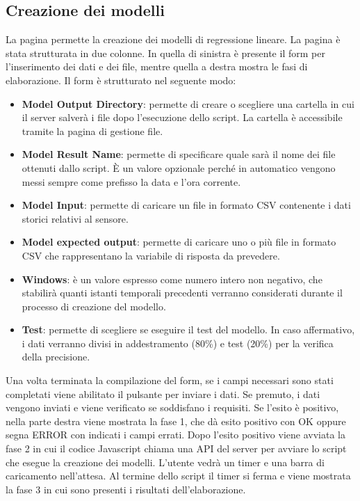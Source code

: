 \subsection{Creazione dei modelli}
\label{secsub:flask-funzionalità-regressione}
La pagina permette la creazione dei modelli di regressione lineare.
La pagina è stata strutturata in due colonne.
In quella di sinistra è presente il form per l'inserimento dei dati e dei file, 
mentre quella a destra mostra le fasi di elaborazione.
Il form è strutturato nel seguente modo:
\begin{itemize}
	\item \textbf{Model Output Directory}: permette di creare o scegliere una cartella in cui il server salverà
	i file dopo l'esecuzione dello script. La cartella è accessibile tramite la pagina di gestione file.
	\item \textbf{Model Result Name}: permette di specificare quale sarà il nome dei file ottenuti dallo script.
	È un valore opzionale perché in automatico vengono messi sempre come prefisso la data e l'ora corrente.
	\item \textbf{Model Input}: permette di caricare un file in formato CSV contenente i dati storici relativi al sensore. 
	\item \textbf{Model expected output}: permette di caricare uno o più file in formato CSV 
	che rappresentano la variabile di risposta da prevedere.
	\item \textbf{Windows}: è un valore espresso come numero intero non negativo, che
	stabilirà quanti istanti temporali precedenti verranno considerati durante il
	processo di creazione del modello.
	\item \textbf{Test}: permette di scegliere se eseguire il test del modello. 
	In caso affermativo, i dati verranno divisi in addestramento (80\%) e test (20\%) per la verifica della precisione.
\end{itemize}
Una volta terminata la compilazione del form, se i campi necessari sono stati completati viene abilitato il pulsante per inviare i dati.
Se premuto, i dati vengono inviati e viene verificato se soddisfano i requisiti.
Se l'esito è positivo, nella parte destra viene mostrata la fase 1, che dà esito positivo con OK oppure segna ERROR con indicati i campi errati.
Dopo l'esito positivo viene avviata la fase 2 in cui il codice Javascript chiama una API del server per avviare
lo script che esegue la creazione dei modelli. L'utente vedrà un timer e una barra di caricamento nell'attesa.
Al termine dello script il timer si ferma e viene mostrata la fase 3 in cui sono presenti i risultati dell'elaborazione.
